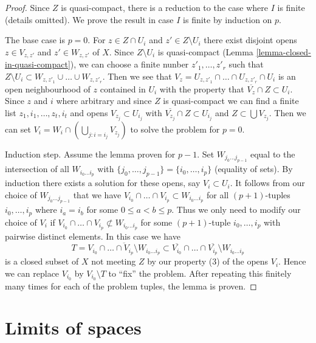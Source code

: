 \begin{proof}
Since $Z$ is quasi-compact, there is a reduction to the
case where $I$ is finite (details omitted).
We prove the result in case $I$ is finite by induction on $p$.

\medskip\noindent
The base case is $p = 0$.
For $z \in Z \cap U_i$ and $z' \in Z \setminus U_i$ there exist
disjoint opens $z \in V_{z, z'}$ and $z' \in W_{z, z'}$ of $X$.
Since $Z \setminus U_i$ is quasi-compact
(Lemma \ref{lemma-closed-in-quasi-compact}),
we can choose a finite nunber $z'_1, \ldots, z'_r$ such that
$Z \setminus U_i \subset W_{z, z'_1} \cup \ldots \cup W_{z, z'_r}$.
Then we see that
$V_z = U_{z, z'_1} \cap \ldots \cap U_{z, z'_r} \cap U_i$
is an open neighbourhood of $z$ contained in $U_i$
with the property that $\overline{V_z} \cap Z \subset U_i$.
Since $z$ and $i$ where arbitrary and since $Z$ is quasi-compact
we can find a finite list $z_1, i_1, \ldots, z_t, i_t$
and opens $V_{z_j} \subset U_{i_j}$ with
$\overline{V_{z_j}} \cap Z \subset U_{i_j}$
and $Z \subset \bigcup V_{z_j}$.
Then we can set $V_i = W_i \cap (\bigcup_{j : i = i_j} V_{z_j})$
to solve the problem for $p = 0$.

\medskip\noindent
Induction step. Assume the lemma proven for $p - 1$.
Set $W_{j_0 \ldots j_{p - 1}}$ equal to the intersection of
all $W_{i_0 \ldots i_p}$ with
$\{j_0, \ldots, j_{p - 1}\} = \{i_0, \ldots, i_p\}$ (equality of sets).
By induction there exists a solution for these opens, say
$V_i \subset U_i$.
It follows from our choice of $W_{j_0 \ldots j_{p - 1}}$ that we have
$V_{i_0} \cap \ldots \cap V_{i_p} \subset W_{i_0 \ldots i_p}$
for all $(p + 1)$-tuples $i_0, \ldots, i_p$ where $i_a = i_b$ for
some $0 \leq a < b \leq p$.
Thus we only need to modify our choice of
$V_i$ if $V_{i_0} \cap \ldots \cap V_{i_p} \not \subset W_{i_0 \ldots i_p}$
for some $(p + 1)$-tuple $i_0, \ldots, i_p$ with pairwise distinct elements.
In this case we have
$$
T =
\overline{V_{i_0} \cap \ldots \cap V_{i_p} \setminus W_{i_0 \ldots i_p}}
\subset
\overline{V_{i_0}} \cap \ldots \cap \overline{V_{i_p}} \setminus
W_{i_0 \ldots i_p}
$$
is a closed subset of $X$ not meeting $Z$ by our property (3) of the
opens $V_i$. Hence we can replace $V_{i_0}$ by $V_{i_0} \setminus T$
to ``fix'' the problem. After repeating this finitely many times for each
of the problem tuples, the lemma is proven.
\end{proof}






\section{Limits of spaces}
\label{section-limits}

